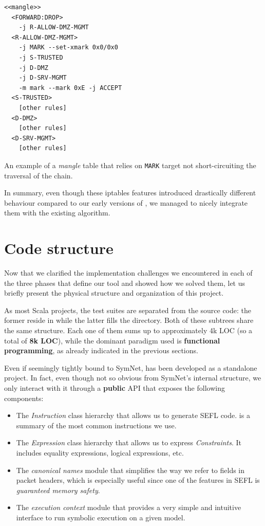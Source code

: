 {\begin{listing}
  \lstset{numbers=none, frame=single, basicstyle=\ttfamily,
    xleftmargin=0.25\textwidth, xrightmargin=0.25\textwidth
  }
  \small
  \begin{lstlisting}
<<mangle>>
  <FORWARD:DROP>
    -j R-ALLOW-DMZ-MGMT
  <R-ALLOW-DMZ-MGMT>
    -j MARK --set-xmark 0x0/0x0
    -j S-TRUSTED
    -j D-DMZ
    -j D-SRV-MGMT
    -m mark --mark 0xE -j ACCEPT
  <S-TRUSTED>
    [other rules]
  <D-DMZ>
    [other rules]
  <D-SRV-MGMT>
    [other rules]
  \end{lstlisting}
  \caption{An example of a \emph{mangle} table that relies on \texttt{MARK}
  target not short-circuiting the traversal of the chain.}
  \label{lst:using-mark}
\end{listing}

In summary, even though these iptables features introduced drastically
different behaviour compared to our early versions of \TOOL, we managed to
nicely integrate them with the existing algorithm.


\section{Code structure}

Now that we clarified the implementation challenges we encountered in each of
the three phases that define our tool and showed how we solved them, let us
briefly present the physical structure and organization of this project.

As most Scala projects, the test suites are separated from the source code: the
former reside in  while the latter fills the 
directory.  Both of these subtrees share the same structure.  Each one of them
sums up to approximately 4k LOC (so a total of \textbf{8k LOC}), while the
dominant paradigm used is \textbf{functional programming}, as already indicated
in the previous sections.

Even if seemingly tightly bound to SymNet, \TOOL has been developed as a
standalone project.  In fact, even though not so obvious from SymNet's internal
structure, we only interact with it through a \textbf{public}
API that exposes the following
components:
\begin{itemize}
  \item The \emph{Instruction} class hierarchy that allows us to generate SEFL
    code.   is a summary of the most
    common instructions we use.
  \item The \emph{Expression} class hierarchy that allows us to express
    \emph{Constraints}.  It includes equality expressions, logical expressions,
    etc.
  \item The \emph{canonical names} module that simplifies the way we refer to
    fields in packet headers, which is especially useful since one of the
    features in SEFL is \emph{guaranteed memory safety}.
  \item The \emph{execution context} module that provides a very simple and
    intuitive interface to run symbolic execution on a given model.
\end{itemize}

}
